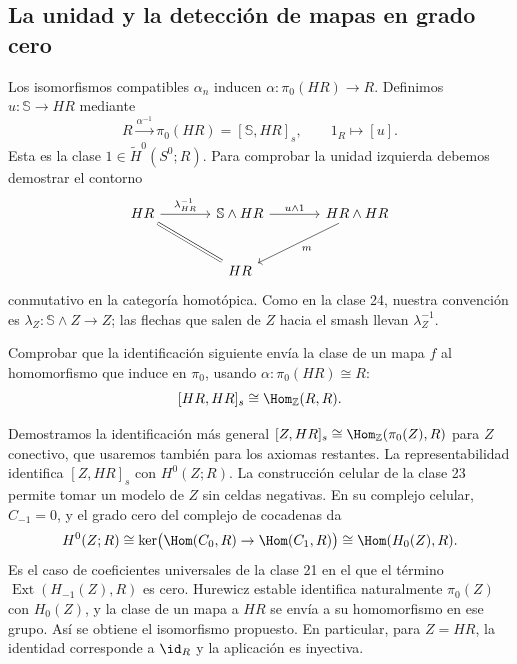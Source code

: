 \subsection{La unidad y la detección de mapas en grado cero}
Los isomorfismos compatibles $\alpha_n$ inducen $\alpha\colon\pi_0(HR)\to R$. Definimos $u\colon\mathbb S\to HR$ mediante
\[
R\xrightarrow{\alpha^{-1}}\pi_0(HR)=[\mathbb S,HR]_s,
\qquad 1_R\longmapsto[u].
\]
Esta es la clase $1\in\widetilde H^0(S^0;R)$. Para comprobar la unidad izquierda debemos demostrar el contorno
\[
\begin{tikzcd}[column sep=large,row sep=large]
HR\arrow[r,"\lambda_{HR}^{-1}"]\arrow[dr,equal]&
\mathbb S\wedge HR\arrow[r,"u\wedge1"]&HR\wedge HR\arrow[dl,"m"]\\
&HR&
\end{tikzcd}
\]
conmutativo en la categoría homotópica. Como en la clase 24, nuestra convención es $\lambda_Z\colon\mathbb S\wedge Z\to Z$; las flechas que salen de $Z$ hacia el smash llevan $\lambda_Z^{-1}$.

\begin{ejer}\label{ejer:c25-deteccion-pi0}
Comprobar que la identificación siguiente envía la clase de un mapa $f$ al homomorfismo que induce en $\pi_0$, usando $\alpha\colon\pi_0(HR)\cong R$:
\[
[HR,HR]_s\cong\Hom_{\mathbb Z}(R,R).
\]
\end{ejer}
\begin{sol}
Demostramos la identificación más general $[Z,HR]_s\cong\Hom_{\mathbb Z}(\pi_0(Z),R)$ para $Z$ conectivo, que usaremos también para los axiomas restantes. La representabilidad identifica $[Z,HR]_s$ con $H^0(Z;R)$. La construcción celular de la clase 23 permite tomar un modelo de $Z$ sin celdas negativas. En su complejo celular, $C_{-1}=0$, y el grado cero del complejo de cocadenas da
\[
H^0(Z;R)
\cong\ker\bigl(\Hom(C_0,R)\to\Hom(C_1,R)\bigr)
\cong\Hom(H_0(Z),R).
\]
Es el caso de coeficientes universales de la clase 21 en el que el término $\operatorname{Ext}(H_{-1}(Z),R)$ es cero. Hurewicz estable identifica naturalmente $\pi_0(Z)$ con $H_0(Z)$, y la clase de un mapa a $HR$ se envía a su homomorfismo en ese grupo. Así se obtiene el isomorfismo propuesto. En particular, para $Z=HR$, la identidad corresponde a $\id_R$ y la aplicación es inyectiva.
\end{sol}

